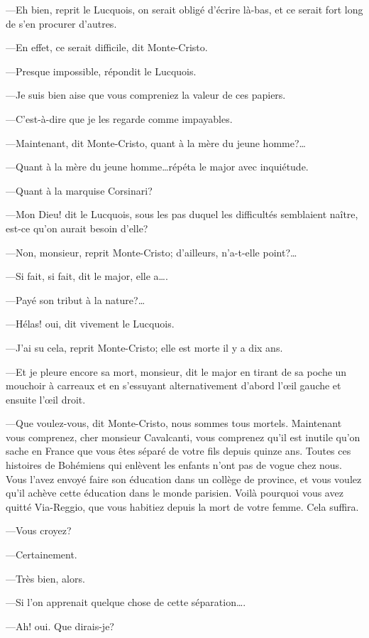 —Eh bien, reprit le Lucquois, on serait obligé d'écrire là-bas, et ce serait fort long de s'en procurer d'autres. 

—En effet, ce serait difficile, dit Monte-Cristo. 

—Presque impossible, répondit le Lucquois. 

—Je suis bien aise que vous compreniez la valeur de ces papiers. 

—C'est-à-dire que je les regarde comme impayables. 

—Maintenant, dit Monte-Cristo, quant à la mère du jeune homme?\dots 

—Quant à la mère du jeune homme\dots répéta le major avec inquiétude. 

—Quant à la marquise Corsinari? 

—Mon Dieu! dit le Lucquois, sous les pas duquel les difficultés semblaient naître, est-ce qu'on aurait besoin d'elle? 

—Non, monsieur, reprit Monte-Cristo; d'ailleurs, n'a-t-elle point?\dots 

—Si fait, si fait, dit le major, elle a\dots. 

—Payé son tribut à la nature?\dots 

—Hélas! oui, dit vivement le Lucquois. 

—J'ai su cela, reprit Monte-Cristo; elle est morte il y a dix ans. 

—Et je pleure encore sa mort, monsieur, dit le major en tirant de sa poche un mouchoir à carreaux et en s'essuyant alternativement d'abord l'œil gauche et ensuite l'œil droit. 

—Que voulez-vous, dit Monte-Cristo, nous sommes tous mortels. Maintenant vous comprenez, cher monsieur Cavalcanti, vous comprenez qu'il est inutile qu'on sache en France que vous êtes séparé de votre fils depuis quinze ans. Toutes ces histoires de Bohémiens qui enlèvent les enfants n'ont pas de vogue chez nous. Vous l'avez envoyé faire son éducation dans un collège de province, et vous voulez qu'il achève cette éducation dans le monde parisien. Voilà pourquoi vous avez quitté Via-Reggio, que vous habitiez depuis la mort de votre femme. Cela suffira. 

—Vous croyez? 

—Certainement. 

—Très bien, alors. 

—Si l'on apprenait quelque chose de cette séparation\dots. 

—Ah! oui. Que dirais-je? 

